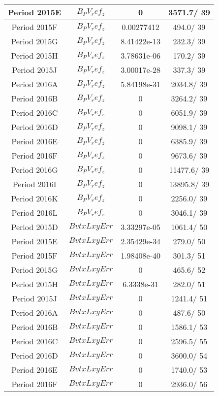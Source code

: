 \documentclass{article}
\begin{document}
\begin{longtable}{c|c|c|c}
\hline
 Period 2015E & $B_PV_ref_z$ & 0 & 3571.7/ 39\\
\hline
 Period 2015F & $B_PV_ref_z$ & 0.00277412 & 494.0/ 39\\
\hline
 Period 2015G & $B_PV_ref_z$ & 8.41422e-13 & 232.3/ 39\\
\hline
 Period 2015H & $B_PV_ref_z$ & 3.78631e-06 & 170.2/ 39\\
\hline
 Period 2015J & $B_PV_ref_z$ & 3.00017e-28 & 337.3/ 39\\
\hline
 Period 2016A & $B_PV_ref_z$ & 5.84198e-31 & 2034.8/ 39\\
\hline
 Period 2016B & $B_PV_ref_z$ & 0 & 3264.2/ 39\\
\hline
 Period 2016C & $B_PV_ref_z$ & 0 & 6051.9/ 39\\
\hline
 Period 2016D & $B_PV_ref_z$ & 0 & 9098.1/ 39\\
\hline
 Period 2016E & $B_PV_ref_z$ & 0 & 6385.9/ 39\\
\hline
 Period 2016F & $B_PV_ref_z$ & 0 & 9673.6/ 39\\
\hline
 Period 2016G & $B_PV_ref_z$ & 0 & 11477.6/ 39\\
\hline
 Period 2016I & $B_PV_ref_z$ & 0 & 13895.8/ 39\\
\hline
 Period 2016K & $B_PV_ref_z$ & 0 & 2256.0/ 39\\
\hline
 Period 2016L & $B_PV_ref_z$ & 0 & 3046.1/ 39\\
\hline
 Period 2015D & $BvtxLxyErr$ & 3.33297e-05 & 1061.4/ 50\\
\hline
 Period 2015E & $BvtxLxyErr$ & 2.35429e-34 & 279.0/ 50\\
\hline
 Period 2015F & $BvtxLxyErr$ & 1.98408e-40 & 301.3/ 51\\
\hline
 Period 2015G & $BvtxLxyErr$ & 0 & 465.6/ 52\\
\hline
 Period 2015H & $BvtxLxyErr$ & 6.3338e-31 & 282.0/ 51\\
\hline
 Period 2015J & $BvtxLxyErr$ & 0 & 1241.4/ 51\\
\hline
 Period 2016A & $BvtxLxyErr$ & 0 & 487.6/ 50\\
\hline
 Period 2016B & $BvtxLxyErr$ & 0 & 1586.1/ 53\\
\hline
 Period 2016C & $BvtxLxyErr$ & 0 & 2596.5/ 55\\
\hline
 Period 2016D & $BvtxLxyErr$ & 0 & 3600.0/ 54\\
\hline
 Period 2016E & $BvtxLxyErr$ & 0 & 1740.0/ 53\\
\hline
 Period 2016F & $BvtxLxyErr$ & 0 & 2936.0/ 56\\

\end{longtable}
\end{document}
